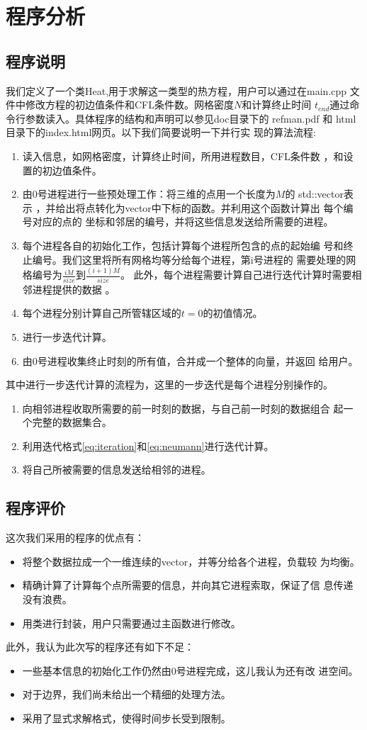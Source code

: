 \documentclass[a4paper,  11pt]{ctexart}
\begin{document}
\section{程序分析}
\subsection{程序说明}
我们定义了一个类Heat,用于求解这一类型的热方程，用户可以通过在main.cpp
文件中修改方程的初边值条件和CFL条件数。网格密度$N$和计算终止时间
$t_{end}$通过命令行参数读入。具体程序的结构和声明可以参见doc目录下的
refman.pdf 和 html 目录下的index.html网页。以下我们简要说明一下并行实
现的算法流程:
\begin{enumerate}
	\item 读入信息，如网格密度，计算终止时间，所用进程数目，CFL条件数
		，和设置的初边值条件。
	\item 由0号进程进行一些预处理工作：将三维的点用一个长度为$M$的
		std::vector表示
		，并给出将点转化为vector中下标的函数。并利用这个函数计算出
		每个编号对应的点的
		坐标和邻居的编号，并将这些信息发送给所需要的进程。
	\item 每个进程各自的初始化工作，包括计算每个进程所包含的点的起始编
		号和终止编号。我们这里将所有网格均等分给每个进程，第i号进程的
		需要处理的网格编号为$\frac{iM}{size}$到$\frac{(i+1)M}{size}$。
		此外，每个进程需要计算自己进行迭代计算时需要相邻进程提供的数据
		。
	\item 每个进程分别计算自己所管辖区域的$t=0$的初值情况。
	\item 进行一步迭代计算。
	\item 由0号进程收集终止时刻的所有值，合并成一个整体的向量，并返回
		给用户。
\end{enumerate}
其中进行一步迭代计算的流程为，这里的一步迭代是每个进程分别操作的。
\begin{enumerate}
\item  向相邻进程收取所需要的前一时刻的数据，与自己前一时刻的数据组合
	起一个完整的数据集合。
\item 利用迭代格式\eqref{eq:iteration}和\eqref{eq:neumann}进行迭代计算。
\item 将自己所被需要的信息发送给相邻的进程。
\end{enumerate}
\subsection{程序评价}
\noindent
这次我们采用的程序的优点有：
\begin{itemize}
	\item 将整个数据拉成一个一维连续的vector，并等分给各个进程，负载较
		为均衡。
	\item 精确计算了计算每个点所需要的信息，并向其它进程索取，保证了信
		息传递没有浪费。
	\item 用类进行封装，用户只需要通过主函数进行修改。
\end{itemize}
此外，我认为此次写的程序还有如下不足：
\begin{itemize}
	\item 一些基本信息的初始化工作仍然由0号进程完成，这儿我认为还有改
		进空间。
	\item 对于边界，我们尚未给出一个精细的处理方法。
	\item 采用了显式求解格式，使得时间步长受到限制。
\end{itemize}
\end{document}
